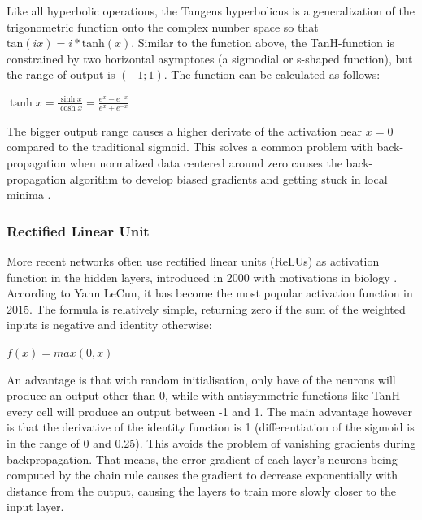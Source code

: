 Like all hyperbolic operations, the Tangens hyperbolicus is a generalization of the trigonometric function onto the complex number space so that $\text{tan}(ix) = i * \text{tanh}(x)$. Similar to the  function above, the TanH-function is constrained by two horizontal asymptotes (a sigmodial or s-shaped function), but the range of output is $(-1; 1)$. The function can be calculated as follows:

{\centering
$\displaystyle \tanh x={\frac {\sinh x}{\cosh x}}={\frac {e^{x}-e^{-x}}{e^{x}+e^{-x}}}$
\par
}

\vspace{20pt}

The bigger output range causes a higher derivate of the activation near  $x=0$ compared to the traditional sigmoid. This solves a common problem with back-propagation when normalized data centered around zero causes the back-propagation algorithm to develop biased gradients and getting stuck in local minima \cite{LeCun1998}.


\subsubsection{Rectified Linear Unit}

More recent networks often use rectified linear units (ReLUs) as activation function in the hidden layers, introduced in 2000 with motivations in biology \cite{Hahnloser:2000aa}. According to Yann LeCun, it has become the most popular activation function in 2015. The formula is relatively simple, returning zero if the sum of the weighted inputs is negative and identity otherwise: 

{\centering
	$\displaystyle f(x)=max(0, x)$\par
}


An advantage is that with random initialisation, only have of the neurons will produce an output other than 0, while with antisymmetric functions like TanH every cell will produce an output between -1 and 1. The main advantage however is that the derivative of the identity function is 1 (differentiation of the sigmoid is in the range of 0 and 0.25). This avoids the problem of vanishing gradients \cite{Hochreiter:01book} during backpropagation. That means, the error gradient of each layer's neurons being computed by the chain rule causes the gradient to decrease exponentially with distance from the output, causing the layers to train more slowly closer to the input layer.

